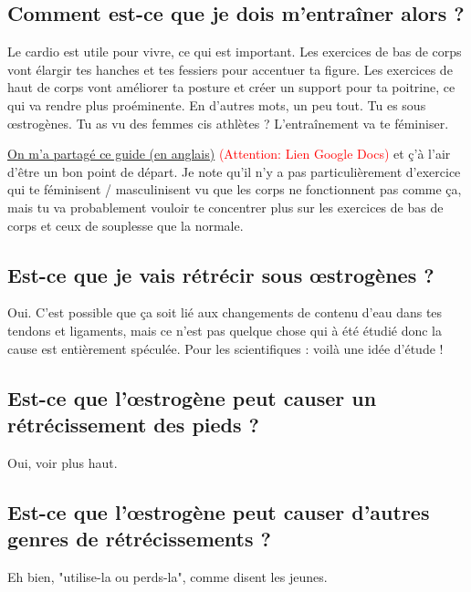 \documentclass{article}
\begin{document}
\subsection{Comment est-ce que je dois m'entraîner alors ?}\label{11-16}

Le cardio est utile pour vivre, ce qui est important. Les exercices de bas de corps vont élargir tes hanches et tes fessiers pour accentuer ta figure. Les exercices de haut de corps vont améliorer ta posture et créer un support pour ta poitrine, ce qui va rendre plus proéminente. En d'autres mots, un peu tout. Tu es sous œstrogènes. Tu as vu des femmes cis athlètes ? L'entraînement va te féminiser.

\href{https://docs.google.com/document/d/1-NyE5EY5TTaRRMhk7HlTbKJ7HifjEsA4jlDO1qKQVl0/edit?tab=t.0}{On m'a partagé ce guide (en anglais)} \textcolor{red}{(Attention: Lien Google Docs)} et ç'à l'air d'être un bon point de départ. Je note qu'il n'y a pas particulièrement d'exercice qui te féminisent / masculinisent vu que les corps ne fonctionnent pas comme ça, mais tu va probablement vouloir te concentrer plus sur les exercices de bas de corps et ceux de souplesse que la normale.  

\subsection{Est-ce que je vais rétrécir sous œstrogènes ?}

Oui. C'est possible que ça soit lié aux changements de contenu d'eau dans tes tendons et ligaments, mais ce n'est pas quelque chose qui à été étudié donc la cause est entièrement spéculée. Pour les scientifiques : voilà une idée d'étude ! 

\subsection{Est-ce que l'œstrogène peut causer un rétrécissement des pieds ?}

Oui, voir plus haut.

\subsection{Est-ce que l'œstrogène peut causer d'autres genres de rétrécissements ?}\label{11-19}

Eh bien, "utilise-la ou perds-la", comme disent les jeunes.
\end{document}
